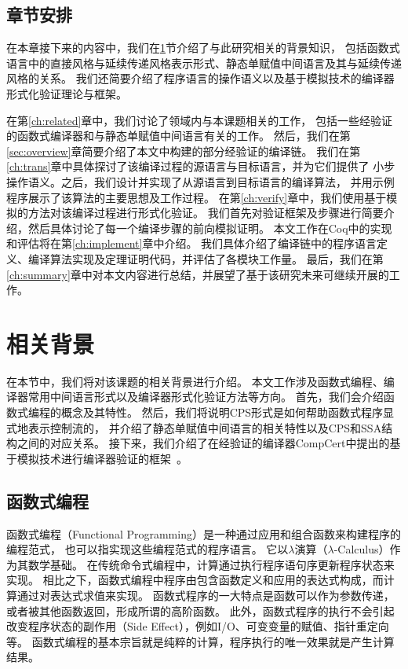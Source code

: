 \subsection{章节安排}

在本章接下来的内容中，我们在\ref{sec:background}节介绍了与此研究相关的背景知识，
包括函数式语言中的直接风格与延续传递风格表示形式、静态单赋值中间语言及其与延续传递风格的关系。
我们还简要介绍了程序语言的操作语义以及基于模拟技术的编译器形式化验证理论与框架。

在第\ref{ch:related}章中，我们讨论了领域内与本课题相关的工作，
包括一些经验证的函数式编译器和与静态单赋值中间语言有关的工作。
然后，我们在第\ref{sec:overview}章简要介绍了本文中构建的部分经验证的编译链。
我们在第\ref{ch:trans}章中具体探讨了该编译过程的源语言与目标语言，并为它们提供了
小步操作语义。之后，我们设计并实现了从源语言到目标语言的编译算法，
并用示例程序展示了该算法的主要思想及工作过程。
在第\ref{ch:verify}章中，我们使用基于模拟的方法对该编译过程进行形式化验证。
我们首先对验证框架及步骤进行简要介绍，然后具体讨论了每一个编译步骤的前向模拟证明。
本文工作在Coq中的实现和评估将在第\ref{ch:implement}章中介绍。
我们具体介绍了编译链中的程序语言定义、编译算法实现及定理证明代码，并评估了各模块工作量。
最后，我们在第\ref{ch:summary}章中对本文内容进行总结，并展望了基于该研究未来可继续开展的工作。

\section{相关背景} \label{sec:background}

在本节中，我们将对该课题的相关背景进行介绍。
本文工作涉及函数式编程、编译器常用中间语言形式以及编译器形式化验证方法等方向。
首先，我们会介绍函数式编程的概念及其特性。
然后，我们将说明CPS形式是如何帮助函数式程序显式地表示控制流的，
并介绍了静态单赋值中间语言的相关特性以及CPS和SSA结构之间的对应关系。
接下来，我们介绍了在经验证的编译器CompCert中提出的基于模拟技术进行编译器验证的框架~\cite{leroy2009formally}。

\subsection{函数式编程}

函数式编程（Functional Programming）是一种通过应用和组合函数来构建程序的编程范式，
也可以指实现这些编程范式的程序语言。
它以$\lambda$演算（$\lambda$-Calculus）作为其数学基础。
在传统命令式编程中，计算通过执行程序语句序更新程序状态来实现。
相比之下，函数式编程中程序由包含函数定义和应用的表达式构成，而计算通过对表达式求值来实现。
函数式程序的一大特点是函数可以作为参数传递，或者被其他函数返回，形成所谓的高阶函数。
此外，函数式程序的执行不会引起改变程序状态的副作用（Side Effect），例如I/O、可变变量的赋值、指针重定向等。
函数式编程的基本宗旨就是纯粹的计算，程序执行的唯一效果就是产生计算结果。

